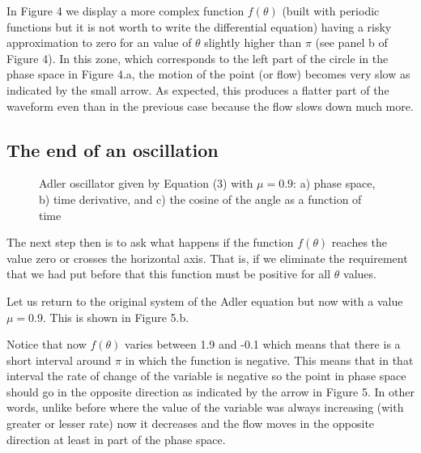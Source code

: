 \documentclass{article}
\begin{document}
In Figure 4 we display a more complex function $f(\theta)$ (built with periodic functions but it is not worth to write the differential equation) having a risky approximation to zero for an value of $\theta$ slightly higher than $\pi$ (see panel b of Figure 4). 
In this zone, which corresponds to the left part of the circle in the phase space in Figure 4.a, the motion of the point (or flow) becomes very slow as indicated by the small arrow. 
As expected, this produces a flatter part of the waveform even than in the previous case because the flow slows down much more.




\subsection{The end of an oscillation}



\begin{figure}[h]
    \centering
    \caption{Adler oscillator given by Equation (3) with $\mu=0.9$: a) phase space, b) time derivative, and c) the cosine of the angle as a function of time} 
    \label{fig_adler4}
\end{figure}

The next step then is to ask what happens if the function $f(\theta)$ reaches the value zero or crosses the horizontal axis. That is, if we eliminate the requirement that we had put before that this function must be positive for all $\theta$ values. 

Let us return to the original system of the Adler equation but now with a value $\mu=0.9$. This is shown in Figure 5.b. 

Notice that now $f(\theta)$ varies between 1.9 and -0.1 which means that there is a short interval around $\pi$ in which the function is negative. 
This means that in that interval the rate of change of the variable is negative so the point in phase space should go in the opposite direction as indicated by the arrow in Figure 5. 
In other words, unlike before where the value of the variable was always increasing (with greater or lesser rate) now it decreases and the flow moves in the opposite direction at least in part of the phase space.  
\end{document}

